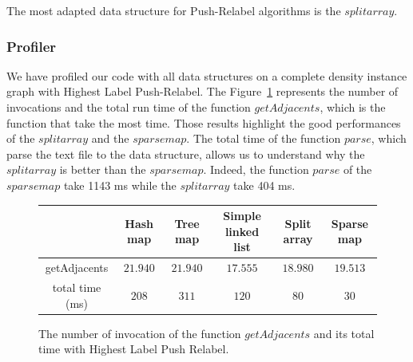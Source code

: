 The most adapted data structure for Push-Relabel algorithms is the $split array$.

\subsubsection{Profiler}
We have profiled our code with all data structures on a complete density instance graph with Highest Label Push-Relabel. The Figure~\ref{fig:pradja} represents the number of invocations and the total run time of the function $getAdjacents$, which is the function that take the most time. Those results highlight the good performances of the $split array$ and the $sparse map$. The total time of the function $parse$, which parse the text file to the data structure, allows us to understand why the $split array$ is better than the $sparse map$. Indeed, the function $parse$ of the $sparse map$ take 1143 ms while the $split array$ take 404 ms. 

\begin{figure}[H]
\centering
\begin{tabular}{|c|c|c|c|c|c|}
	\hline
     & \textbf{Hash map} & \textbf{Tree map} & \textbf{Simple linked list} & \textbf{Split array} & \textbf{Sparse map}\\
     \hline	
   getAdjacents & $21.940$ & $21.940$ & $17.555$ & $18.980$ & $19.513$ \\
   total time (ms) & $208$ & $311$ & $120$ & $80$ & $30$ \\
   \hline
\end{tabular}
\caption{The number of invocation of the function $getAdjacents$ and its total time with Highest Label Push Relabel.}
\label{fig:pradja}
\end{figure}

